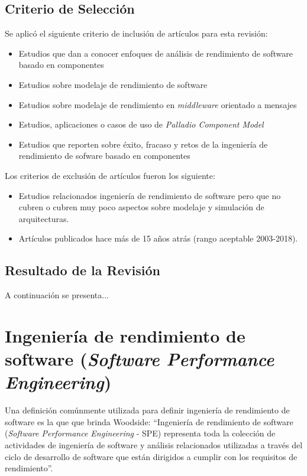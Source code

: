 \documentclass[11pt, twoside]{report}
\begin{document}
\section{Criterio de Selección}
Se aplicó el siguiente criterio de inclusión de artículos para esta revisión:
\begin{itemize}
    \item Estudios que dan a conocer enfoques de análisis de rendimiento de software basado en componentes
    \item Estudios sobre modelaje de rendimiento de software
    \item Estudios sobre modelaje de rendimiento en \emph{middleware} orientado a mensajes
    \item Estudios, aplicaciones o casos de uso de \emph{Palladio Component Model}
    \item Estudios que reporten sobre éxito, fracaso y retos de la ingeniería de rendimiento de sofware basado en componentes
\end{itemize}

Los criterios de exclusión de artículos fueron los siguiente:
\begin{itemize}
    \item Estudios relacionados ingeniería de rendimiento de software pero que no cubren o cubren muy poco aspectos sobre modelaje y simulación de arquitecturas.
    \item Artículos publicados hace más de 15 años atrás (rango aceptable 2003-2018).
\end{itemize}

\section{Resultado de la Revisión}
A continuación se presenta...

\chapter{Ingeniería de rendimiento de software (\emph{Software Performance Engineering})}

Una definición comúnmente utilizada para definir ingeniería de rendimiento de software es la que que brinda Woodside\cite{woodside-et-al}: ``Ingeniería de rendimiento de software (\emph{Software Performance Engineering} - SPE) representa toda la colección de actividades de ingeniería de software y análisis relacionados utilizadas a través del ciclo de desarrollo de software que están dirigidos a cumplir con los requisitos de rendimiento''. 
\end{document}
